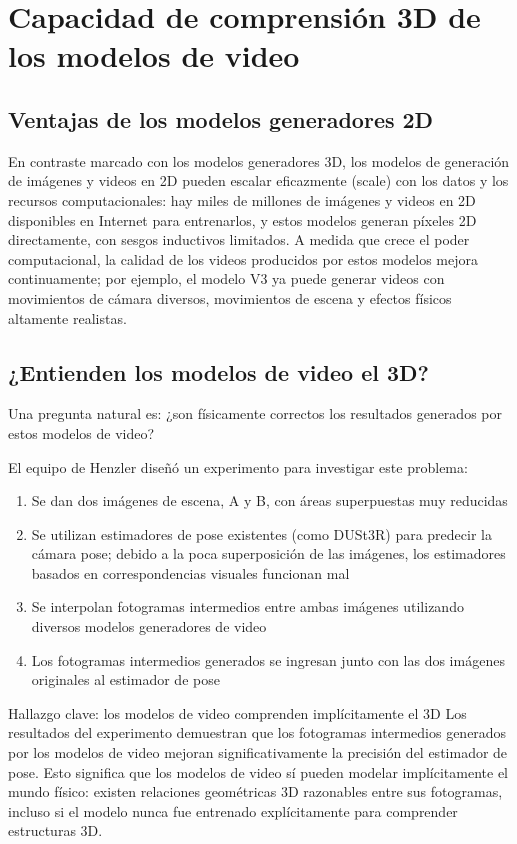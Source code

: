 \section{Capacidad de comprensión 3D de los modelos de video}

\subsection{Ventajas de los modelos generadores 2D}

En contraste marcado con los modelos generadores 3D, los modelos de generación de imágenes y videos en 2D pueden escalar eficazmente (scale) con los datos y los recursos computacionales: hay miles de millones de imágenes y videos en 2D disponibles en Internet para entrenarlos, y estos modelos generan píxeles 2D directamente, con sesgos inductivos limitados. A medida que crece el poder computacional, la calidad de los videos producidos por estos modelos mejora continuamente; por ejemplo, el modelo V3 ya puede generar videos con movimientos de cámara diversos, movimientos de escena y efectos físicos altamente realistas.

\subsection{¿Entienden los modelos de video el 3D?}

Una pregunta natural es: ¿son físicamente correctos los resultados generados por estos modelos de video?

El equipo de Henzler diseñó un experimento para investigar este problema:

\begin{enumerate}
    \item Se dan dos imágenes de escena, A y B, con áreas superpuestas muy reducidas
    \item Se utilizan estimadores de pose existentes (como DUSt3R) para predecir la cámara pose; debido a la poca superposición de las imágenes, los estimadores basados en correspondencias visuales funcionan mal
    \item Se interpolan fotogramas intermedios entre ambas imágenes utilizando diversos modelos generadores de video
    \item Los fotogramas intermedios generados se ingresan junto con las dos imágenes originales al estimador de pose
\end{enumerate}

\begin{importantbox}{Hallazgo clave: los modelos de video comprenden implícitamente el 3D}
Los resultados del experimento demuestran que los fotogramas intermedios generados por los modelos de video mejoran significativamente la precisión del estimador de pose. Esto significa que los modelos de video sí pueden modelar implícitamente el mundo físico: existen relaciones geométricas 3D razonables entre sus fotogramas, incluso si el modelo nunca fue entrenado explícitamente para comprender estructuras 3D.
\end{importantbox}

